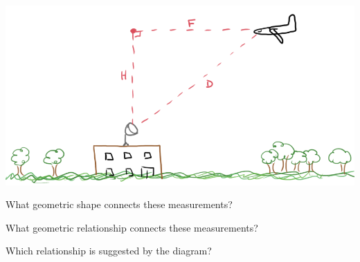 \documentclass{ximera}
\begin{document}
\begin{image}
\includegraphics{pics/plane_2.png}
\end{image}





\begin{question} 


What geometric shape connects these measurements?

\begin{multipleChoice}
\end{multipleChoice}

\end{question}







\begin{question} 


What geometric relationship connects these measurements?

\begin{multipleChoice}
\end{multipleChoice}

\end{question}






\begin{question} 


Which relationship is suggested by the diagram?

\begin{multipleChoice}
\end{multipleChoice}

\end{question}
\end{document}
